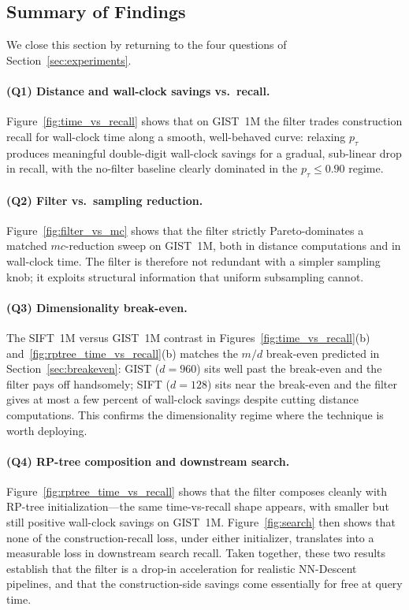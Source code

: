\subsection{Summary of Findings}
\label{sec:summary}

We close this section by returning to the four questions of Section~\ref{sec:experiments}.

\paragraph{(Q1) Distance and wall-clock savings vs.\ recall.}
Figure~\ref{fig:time_vs_recall} shows that on GIST~1M the filter trades construction recall for wall-clock time along a smooth, well-behaved curve: relaxing $p_\tau$ produces meaningful double-digit wall-clock savings for a gradual, sub-linear drop in recall, with the no-filter baseline clearly dominated in the $p_\tau{\leq}0.90$ regime.

\paragraph{(Q2) Filter vs.\ sampling reduction.}
Figure~\ref{fig:filter_vs_mc} shows that the filter strictly Pareto-dominates a matched $mc$-reduction sweep on GIST~1M, both in distance computations and in wall-clock time.
The filter is therefore not redundant with a simpler sampling knob; it exploits structural information that uniform subsampling cannot.

\paragraph{(Q3) Dimensionality break-even.}
The SIFT~1M versus GIST~1M contrast in Figures~\ref{fig:time_vs_recall}(b) and~\ref{fig:rptree_time_vs_recall}(b) matches the $m/d$ break-even predicted in Section~\ref{sec:breakeven}: GIST ($d{=}960$) sits well past the break-even and the filter pays off handsomely; SIFT ($d{=}128$) sits near the break-even and the filter gives at most a few percent of wall-clock savings despite cutting distance computations.
This confirms the dimensionality regime where the technique is worth deploying.

\paragraph{(Q4) RP-tree composition and downstream search.}
Figure~\ref{fig:rptree_time_vs_recall} shows that the filter composes cleanly with RP-tree initialization---the same time-vs-recall shape appears, with smaller but still positive wall-clock savings on GIST~1M.
Figure~\ref{fig:search} then shows that none of the construction-recall loss, under either initializer, translates into a measurable loss in downstream search recall.
Taken together, these two results establish that the filter is a drop-in acceleration for realistic NN-Descent pipelines, and that the construction-side savings come essentially for free at query time.

